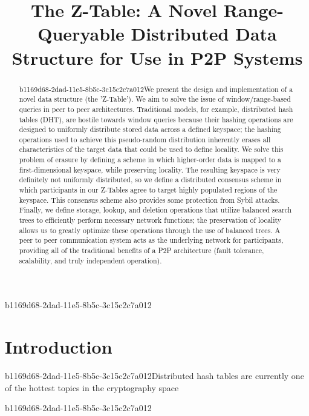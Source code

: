 \documentclass[12pt]{article}
\title{The Z-Table: A Novel Range-Queryable Distributed Data Structure for Use in P2P Systems}
\begin{document}
\maketitle

b1169d68-2dad-11e5-8b5c-3c15c2c7a012\begin{abstract}
b1169d68-2dad-11e5-8b5c-3c15c2c7a012We present the design and implementation of a novel data structure (the 'Z-Table'). We aim to solve the issue of window/range-based queries in peer to peer architectures. Traditional models, for example,  distributed hash tables (DHT), are hostile towards window queries because their hashing operations are designed to uniformly distribute stored data across a defined keyspace; the hashing operations used to achieve this pseudo-random distribution inherently erases all characteristics of the target data that could be used to define locality. We solve this problem of erasure by defining a scheme in which higher-order data is mapped to a first-dimensional keyspace, while preserving locality. The resulting keyspace is very definitely not uniformly distributed, so we define a distributed consensus scheme in which participants in our Z-Tables agree to target highly populated regions of the keyspace. This consensus scheme also provides some protection from Sybil attacks. Finally, we define storage, lookup, and deletion operations that utilize balanced search trees to efficiently perform necessary network functions; the preservation of locality allows us to greatly optimize these operations through the use of balanced trees. A peer to peer communication system acts as the underlying network for participants, providing all of the traditional benefits of a P2P architecture (fault tolerance, scalability, and truly independent operation).
\end{abstract}


\newpage
\section{Introduction}
b1169d68-2dad-11e5-8b5c-3c15c2c7a012Distributed hash tables are currently one of the hottest topics in the cryptography space~\cite{Stoica:2001dj,Rowstron:2001ea,Ratnasamy:2001wn}

\printbibliography
b1169d68-2dad-11e5-8b5c-3c15c2c7a012
\end{document}
